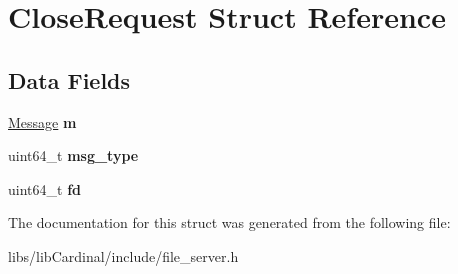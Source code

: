 \hypertarget{structCloseRequest}{}\section{Close\+Request Struct Reference}
\label{structCloseRequest}
\subsection*{Data Fields}
\begin{DoxyCompactItemize}
\item 
\hyperlink{structMessage}{Message} {\bfseries m}\hypertarget{structCloseRequest_a31f05f65bc6523c8e74565404f3ae1f5}{}\label{structCloseRequest_a31f05f65bc6523c8e74565404f3ae1f5}

\item 
uint64\+\_\+t {\bfseries msg\+\_\+type}\hypertarget{structCloseRequest_a8e5db62fefc6d8d244bfdb189db27d9b}{}\label{structCloseRequest_a8e5db62fefc6d8d244bfdb189db27d9b}

\item 
uint64\+\_\+t {\bfseries fd}\hypertarget{structCloseRequest_aca3d7a414a77bd7af5c7b03346550147}{}\label{structCloseRequest_aca3d7a414a77bd7af5c7b03346550147}

\end{DoxyCompactItemize}


The documentation for this struct was generated from the following file\+:\begin{DoxyCompactItemize}
\item 
libs/lib\+Cardinal/include/file\+\_\+server.\+h\end{DoxyCompactItemize}
